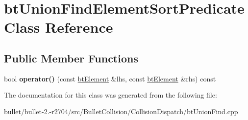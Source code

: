 \hypertarget{classbt_union_find_element_sort_predicate}{\section{bt\+Union\+Find\+Element\+Sort\+Predicate Class Reference}
\label{classbt_union_find_element_sort_predicate}
}
\subsection*{Public Member Functions}
\begin{DoxyCompactItemize}
\item 
\hypertarget{classbt_union_find_element_sort_predicate_abd6b597bda5ce206fbc2c811f8543a54}{bool {\bfseries operator()} (const \hyperlink{structbt_element}{bt\+Element} \&lhs, const \hyperlink{structbt_element}{bt\+Element} \&rhs) const }\label{classbt_union_find_element_sort_predicate_abd6b597bda5ce206fbc2c811f8543a54}

\end{DoxyCompactItemize}


The documentation for this class was generated from the following file\+:\begin{DoxyCompactItemize}
\item 
bullet/bullet-\/2.-\/r2704/src/\+Bullet\+Collision/\+Collision\+Dispatch/bt\+Union\+Find.\+cpp\end{DoxyCompactItemize}
